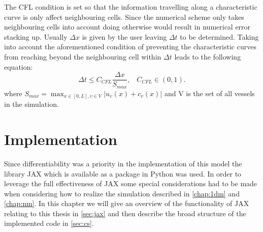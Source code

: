 \documentclass[a4paper, oneside]{discothesis}
\begin{document}
The CFL condition is set so that the information travelling along a characteristic curve is only affect neighbouring cells. 
Since the numerical scheme only takes neighbouring cells into account doing otherwise would result in numerical error stacking up.
Usually $\Delta x$ is given by the user leaving $\Delta t$ to be determined.
Taking into account the aforementioned condition of preventing the characteristic curves from reaching beyond the neighbouring cell within $\Delta t$ leads to the following equation:
\begin{equation}
	\Delta t \leq C_{CFL} \frac{\Delta x}{S_{max}},\hspace{10pt}  C_{CFL} \in (0,1).
\end{equation}
where $S_{max} = \max_{x \in [0,L], v \in V} | u_v(x) + c_v(x) |$ and V is the set of all vessels in the simulation.  


\chapter{Implementation} \label{chap:impl}
Since differentiability was a priority in the implementation of this model the library JAX which is available as a package in Python was used.
In order to leverage the full effectiveness of JAX some special considerations had to be made when considering how to realize the simulation described in \autoref{chap:1dm} and \autoref{chap:nm}.
In this chapter we  will give an overview of the functionality of JAX relating to this thesis in \autoref{sec:jax} and then describe the broad structure of the implemented code in \autoref{sec:cs}.
\end{document}
